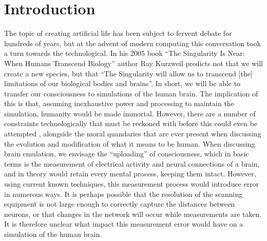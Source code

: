 \chapter{Introduction}

The topic of creating artificial life has been subject to fervent debate for hundreds of years, but at the advent of modern computing this conversation took a turn towards the technological. In his 2005 book “The Singularity Is Near: When Humans Transcend Biology” author Ray Kurzweil predicts not that we will create a new species, but that “The Singularity will allow us to transcend [the] limitations of our biological bodies and brains”\parencite{kurzweil_singularity_2006}. In short, we will be able to transfer our consciousness to simulations of the human brain. The implication of this is that, assuming inexhaustive power and processing to maintain the simulation, humanity would be made immortal. However, there are a number of constraints technologically that must be reckoned with before this could even be attempted \parencite{bostrom_whole_2008}, alongside the moral quandaries that are ever present when discussing the evolution and modification of what it means to be human. When discussing brain emulation, we envisage the “uploading” of consciousness, which in basic terms is the measurement of electrical activity and neural connections of a brain, and in theory would retain every mental process, keeping them intact. However, using current known techniques, this measurement process would introduce error in numerous ways. It is perhaps possible that the resolution of the scanning equipment is not large enough to correctly capture the distances between neurons, or that changes in the network will occur while measurements are taken. It is therefore unclear what impact this measurement error would have on a simulation of the human brain.